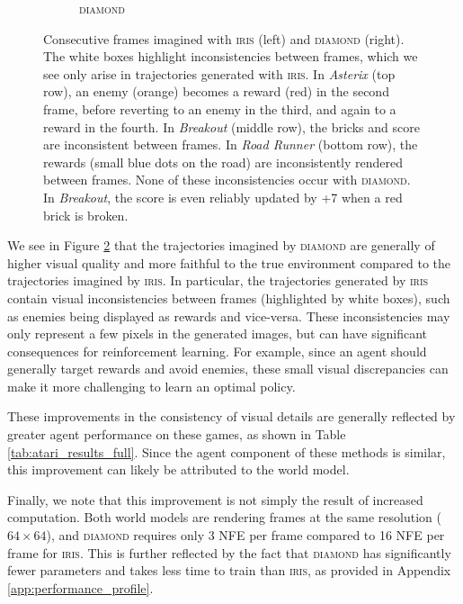 \begin{figure}[h]
\begin{subfigure}{0.49\textwidth}
    \caption{\textsc{diamond}} \label{fig:iris_vs_diamond__diamond}
  \end{subfigure}%
\caption{Consecutive frames imagined with \textsc{iris} (left) and \textsc{diamond} (right). The white boxes highlight inconsistencies between frames, which we see only arise in trajectories generated with \textsc{iris}. In \textit{Asterix} (top row), an enemy (orange) becomes a reward (red) in the second frame, before reverting to an enemy in the third, and again to a reward in the fourth. In \textit{Breakout} (middle row), the bricks and score are inconsistent between frames. In \textit{Road Runner} (bottom row), the rewards (small blue dots on the road) are inconsistently rendered between frames. None of these inconsistencies occur with \textsc{diamond}. In \textit{Breakout}, the score is even reliably updated by +7 when a red brick is broken\protect\footnotemark.}
\label{fig:iris_vs_diamond}
\end{figure}


We see in Figure \ref{fig:iris_vs_diamond} that the trajectories imagined by \textsc{diamond} are generally of higher visual quality and more faithful to the true environment compared to the trajectories imagined by \textsc{iris}. In particular, the trajectories generated by \textsc{iris} contain visual inconsistencies between frames (highlighted by white boxes), such as enemies being displayed as rewards and vice-versa. These inconsistencies may only represent a few pixels in the generated images, but can have significant consequences for reinforcement learning. For example, since an agent should generally target rewards and avoid enemies, these small visual discrepancies can make it more challenging to learn an optimal policy.

These improvements in the consistency of visual details are generally reflected by greater agent performance on these games, as shown in Table \ref{tab:atari_results_full}. Since the agent component of these methods is similar, this improvement can likely be attributed to the world model. 

Finally, we note that this improvement is not simply the result of increased computation. Both world models are rendering frames at the same resolution ($64\times64$), and \textsc{diamond} requires only 3 NFE per frame compared to 16 NFE per frame for \textsc{iris}. This is further reflected by the fact that \textsc{diamond} has significantly fewer parameters and takes less time to train than \textsc{iris}, as provided in Appendix \ref{app:performance_profile}.